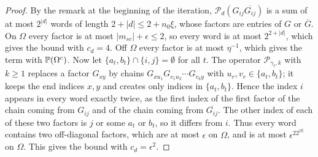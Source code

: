 \begin{proof}
By the remark at the beginning of the iteration, $\mathcal P_d(G_{ij}\overline{G_{ij}})$ is a sum of at most $2^{|d|}$ words of length $2+|d|\le2+n_0\xi$, whose factors are entries of $G$ or $\overline G$. On $\Omega$ every factor is at most $|m_{sc}|+\epsilon\le2$, so every word is at most $2^{2+|d|}$, which gives the bound with $c_d=4$. Off $\Omega$ every factor is at most $\eta^{-1}$, which gives the term with $\mathbb{P}(\Omega^c)$. Now let $\{a_t,b_t\}\cap\{i,j\}=\emptyset$ for all $t$. The operator $\mathcal P_{\gamma_t,k}$ with $k\ge1$ replaces a factor $G_{xy}$ by chains $G_{xu_1}G_{v_1u_2}\cdots G_{v_ky}$ with $u_r,v_r\in\{a_t,b_t\}$; it keeps the end indices $x,y$ and creates only indices in $\{a_t,b_t\}$. Hence the index $i$ appears in every word exactly twice, as the first index of the first factor of the chain coming from $G_{ij}$ and of the chain coming from $\overline{G_{ij}}$. The other index of each of these two factors is $j$ or some $a_t$ or $b_t$, so it differs from $i$. Thus every word contains two off-diagonal factors, which are at most $\epsilon$ on $\Omega$, and is at most $\epsilon^22^{|d|}$ on $\Omega$. This gives the bound with $c_d=\epsilon^2$.
\end{proof}

